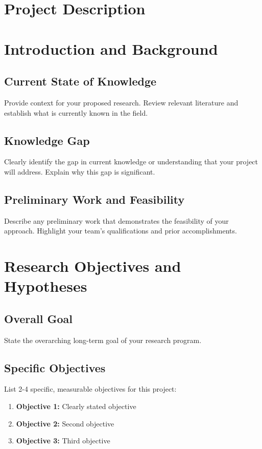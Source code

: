 \documentclass[11pt,letterpaper]{article}
\begin{document}
\newpage


\section*{Project Description}

\section{Introduction and Background}
\subsection{Current State of Knowledge}
Provide context for your proposed research. Review relevant literature and establish what is currently known in the field.

\subsection{Knowledge Gap}
Clearly identify the gap in current knowledge or understanding that your project will address. Explain why this gap is significant.

\subsection{Preliminary Work and Feasibility}
Describe any preliminary work that demonstrates the feasibility of your approach. Highlight your team's qualifications and prior accomplishments.

\section{Research Objectives and Hypotheses}
\subsection{Overall Goal}
State the overarching long-term goal of your research program.

\subsection{Specific Objectives}
List 2-4 specific, measurable objectives for this project:
\begin{enumerate}
    \item \textbf{Objective 1:} Clearly stated objective
    \item \textbf{Objective 2:} Second objective
    \item \textbf{Objective 3:} Third objective
\end{enumerate}
\end{document}
